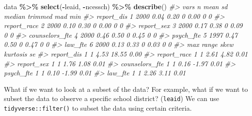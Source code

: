 \documentclass[
]{book}
\newenvironment{Shaded}{\begin{snugshade}}{\end{snugshade}}
\newcommand{\CommentTok}[1]{\textcolor[rgb]{0.56,0.35,0.01}{\textit{#1}}}
\newcommand{\FunctionTok}[1]{\textcolor[rgb]{0.13,0.29,0.53}{\textbf{#1}}}
\newcommand{\NormalTok}[1]{#1}
\newcommand{\SpecialCharTok}[1]{\textcolor[rgb]{0.81,0.36,0.00}{\textbf{#1}}}
\begin{document}
\begin{Shaded}
\begin{Highlighting}[]
\NormalTok{data }\SpecialCharTok{\%\textgreater{}\%} 
  \FunctionTok{select}\NormalTok{(}\SpecialCharTok{{-}}\NormalTok{leaid, }\SpecialCharTok{{-}}\NormalTok{ncessch) }\SpecialCharTok{\%\textgreater{}\%} 
  \FunctionTok{describe}\NormalTok{()}
\CommentTok{\#\textgreater{}                vars    n mean   sd median trimmed mad min}
\CommentTok{\#\textgreater{} report\_dis        1 2000 0.04 0.20      0    0.00   0   0}
\CommentTok{\#\textgreater{} report\_race       2 2000 0.10 0.30      0    0.00   0   0}
\CommentTok{\#\textgreater{} report\_sex        3 2000 0.17 0.38      0    0.09   0   0}
\CommentTok{\#\textgreater{} counselors\_fte    4 2000 0.46 0.50      0    0.45   0   0}
\CommentTok{\#\textgreater{} psych\_fte         5 1997 0.47 0.50      0    0.47   0   0}
\CommentTok{\#\textgreater{} law\_fte           6 2000 0.13 0.33      0    0.03   0   0}
\CommentTok{\#\textgreater{}                max range skew kurtosis   se}
\CommentTok{\#\textgreater{} report\_dis       1     1 4.53    18.55 0.00}
\CommentTok{\#\textgreater{} report\_race      1     1 2.61     4.82 0.01}
\CommentTok{\#\textgreater{} report\_sex       1     1 1.76     1.08 0.01}
\CommentTok{\#\textgreater{} counselors\_fte   1     1 0.16    {-}1.97 0.01}
\CommentTok{\#\textgreater{} psych\_fte        1     1 0.10    {-}1.99 0.01}
\CommentTok{\#\textgreater{} law\_fte          1     1 2.26     3.11 0.01}
\end{Highlighting}
\end{Shaded}

What if we want to look at a subset of the data?
For example, what if we want to subset the data to observe a specific school district?
(\texttt{leaid}) We can use \texttt{tidyverse::filter()} to subset the data using certain criteria.
\end{document}
